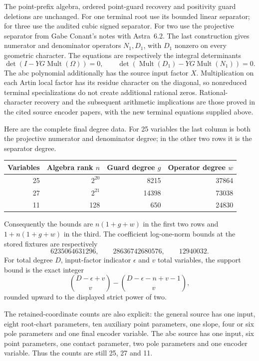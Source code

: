 \documentclass[11pt]{article}
\begin{document}
The point-prefix algebra, ordered point-guard recovery and positivity
guard deletions are unchanged. For one terminal root use its bounded
linear separator; for three use the audited cubic signed separator.
For two use the projective separator from Gabe Conant's notes with
Astra~6.2. The last construction gives numerator and denominator
operators $N_1,D_1$, with $D_1$ nonzero on every geometric character.
The equations are respectively the integral determinants
\[
 \det(I-YG\operatorname{Mult}(\Omega))=0,
 \qquad
 \det(\operatorname{Mult}(D_1)-YG\operatorname{Mult}(N_1))=0.
\]
The abc polynomial additionally has the source input factor $X$.
Multiplication on each Artin local factor has its residue character on
the diagonal, so nonreduced terminal specializations do not create
additional rational zeros. Rational-character recovery and the
subsequent arithmetic implications are those proved in the cited
source encoder papers, with the new terminal equations supplied above.

Here are the complete final degree data. For 25 variables the last
column is both the projective numerator and denominator degree;
in the other two rows it is the separator degree.
\begin{center}\begin{tabular}{rrrr}
\toprule
Variables&Algebra rank $n$&Guard degree $g$&Operator degree $w$\\\midrule
25&$2^{20}$&8215&37864\\
27&$2^{21}$&14398&73038\\
11&128&650&24830\\\bottomrule
\end{tabular}\end{center}
Consequently the bounds are $n(1+g+w)$ in the first two rows and
$1+n(1+g+w)$ in the third. The coefficient log-one-norm bounds
at the stored fixtures are respectively
\[
 6235064631296,\qquad28636742680576,\qquad12940032.
\]
For total degree $D$, input-factor indicator $\epsilon$ and $v$ total
variables, the support bound is the exact integer
\[
 {D-\epsilon+v\choose v}-{D-\epsilon-n+v-1\choose v},
\]
rounded upward to the displayed strict power of two.

The retained-coordinate counts are also explicit: the general source
has one input, eight root-chart parameters, ten auxiliary point
parameters, one slope, four or six pole parameters and one final
encoder variable. The abc source has one input, six point parameters,
one contact parameter, two pole parameters and one encoder variable.
Thus the counts are still 25, 27 and 11.
\end{document}
